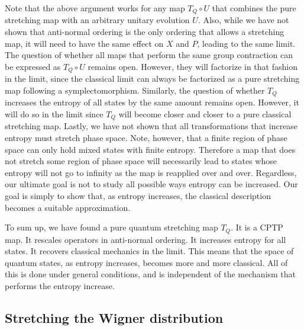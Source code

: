 \documentclass{SciPost}
\begin{document}
Note that the above argument works for any map $T_Q \circ U$ that combines the pure stretching map with an arbitrary unitary evolution $U$. Also, while we have not shown that anti-normal ordering is the only ordering that allows a stretching map, it will need to have the same effect on $X$ and $P$, leading to the same limit. The question of whether all maps that perform the same group contraction can be expressed as $T_Q \circ U$ remains open. However, they will factorize in that fashion in the limit, since the classical limit can always be factorized as a pure stretching map following a symplectomorphism. Similarly, the question of whether $T_Q$ increases the entropy of all states by the same amount remains open. However, it will do so in the limit since $T_Q$ will become closer and closer to a pure classical stretching map. Lastly, we have not shown that all transformations that increase entropy must stretch phase space. Note, however, that a finite region of phase space can only hold mixed states with finite entropy. Therefore a map that does not stretch some region of phase space will necessarily lead to states whose entropy will not go to infinity as the map is reapplied over and over. Regardless, our ultimate goal is not to study all possible ways entropy can be increased. Our goal is simply to show that, as entropy increases, the classical description becomes a suitable approximation.

To sum up, we have found a pure quantum stretching map $T_Q$. It is a CPTP map. It rescales operators in anti-normal ordering. It increases entropy for all states. It recovers classical mechanics in the limit. This means that the space of quantum states, as entropy increases, becomes more and more classical. All of this is done under general conditions, and is independent of the mechanism that performs the entropy increase.

\subsection{Stretching the Wigner distribution}
\end{document}

